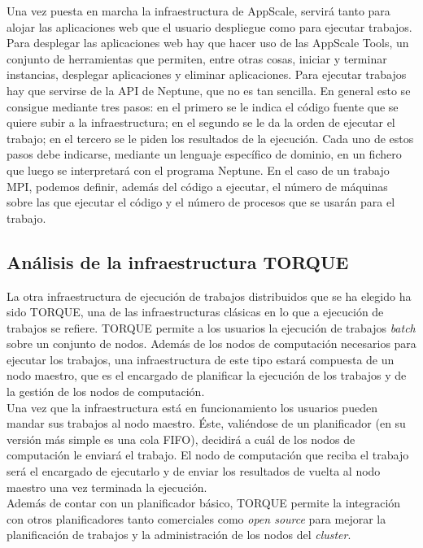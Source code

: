 Una vez puesta en marcha la infraestructura de AppScale, servirá tanto para alojar las aplicaciones web que el usuario despliegue como para ejecutar trabajos. Para desplegar las aplicaciones web hay que hacer uso de las AppScale Tools, un conjunto de herramientas que permiten, entre otras cosas, iniciar y terminar instancias, desplegar aplicaciones y eliminar aplicaciones. Para ejecutar trabajos hay que servirse de la API de Neptune, que no es tan sencilla. En general esto se consigue mediante tres pasos: en el primero se le indica el código fuente que se quiere subir a la infraestructura; en el segundo se le da la orden de ejecutar el trabajo; en el tercero se le piden los resultados de la ejecución. Cada uno de estos pasos debe indicarse, mediante un lenguaje específico de dominio, en un fichero que luego se interpretará con el programa Neptune. En el caso de un trabajo MPI, podemos definir, además del código a ejecutar, el número de máquinas sobre las que ejecutar el código y el número de procesos que se usarán para el trabajo.


\subsection{Análisis de la infraestructura TORQUE}

La otra infraestructura de ejecución de trabajos distribuidos que se ha elegido ha sido TORQUE, una de las infraestructuras clásicas en lo que a ejecución de trabajos se refiere. TORQUE permite a los usuarios la ejecución de trabajos \emph{batch} sobre un conjunto de nodos. Además de los nodos de computación necesarios para ejecutar los trabajos, una infraestructura de este tipo estará compuesta de un nodo maestro, que es el encargado de planificar la ejecución de los trabajos y de la gestión de los nodos de computación. \\

Una vez que la infraestructura está en funcionamiento los usuarios pueden mandar sus trabajos al nodo maestro. Éste, valiéndose de un planificador (en su versión más simple es una cola FIFO), decidirá a cuál de los nodos de computación le enviará el trabajo. El nodo de computación que reciba el trabajo será el encargado de ejecutarlo y de enviar los resultados de vuelta al nodo maestro una vez terminada la ejecución. \\


Además de contar con un planificador básico, TORQUE permite la integración con otros planificadores tanto comerciales como \emph{open source} para mejorar la planificación de trabajos y la administración de los nodos del \emph{cluster}.
